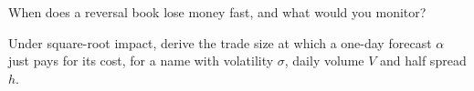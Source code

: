 \begin{interviewq}\label{iq:s1:short-term-reversal:5}
When does a reversal book lose money fast, and what would you monitor?
\end{interviewq}

\begin{interviewq}\label{iq:s1:short-term-reversal:6}
Under square-root impact, derive the trade size at which a one-day forecast $\alpha$ just pays for its cost, for a name with volatility $\sigma$, daily volume
$V$ and half spread $h$.
\end{interviewq}
